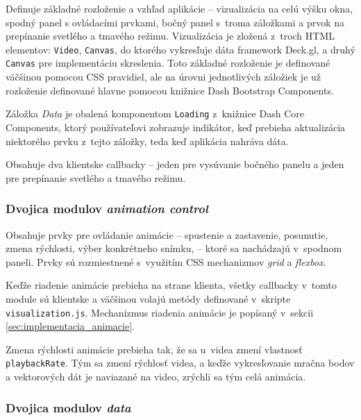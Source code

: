 Definuje základné rozloženie a vzhľad aplikácie -- vizualizácia na celú výšku okna, spodný panel s ovládacími prvkami, bočný panel s~troma záložkami a prvok na prepínanie svetlého a tmavého režimu. Vizualizácia je zložená z~troch HTML elementov: \texttt{Video}, \texttt{Canvas}, do ktorého vykresľuje dáta framework Deck.gl, a druhý \texttt{Canvas} pre implementáciu skreslenia. Toto základné rozloženie je definované väčšinou pomocou CSS pravidiel, ale na úrovni jednotlivých záložiek je už rozloženie definované hlavne pomocou knižnice Dash Bootstrap Components.

Záložka \emph{Data} je obalená komponentom \texttt{Loading} z~knižnice Dash Core Components, ktorý používateľovi zobrazuje indikátor, keď prebieha aktualizácia niektorého prvku z~tejto záložky, teda keď aplikácia nahráva dáta.

Obsahuje dva klientske callbacky -- jeden pre vysúvanie bočného panelu a jeden pre prepínanie svetlého a tmavého režimu.

\subsubsection{Dvojica modulov \emph{animation control} }

Obsahuje prvky pre ovládanie animácie -- spustenie a zastavenie, posunutie, zmena rýchlosti, výber konkrétneho snímku, -- ktoré sa nachádzajú v~spodnom paneli. Prvky sú rozmiestnené s~využitím CSS mechanizmov \emph{grid} a \emph{flexbox}.

Keďže riadenie animácie prebieha na strane klienta, všetky callbacky v~tomto module sú klientske a väčšinou volajú metódy definované v~skripte \texttt{visualization.js}. Mechanizmus riadenia animácie je popísaný v~sekcii \ref{sec:implementacia_animacie}.

Zmena rýchlosti animácie prebieha tak, že sa u~videa zmení vlastnosť \texttt{playbackRate}. Tým sa zmení rýchlosť videa, a keďže vykresľovanie mračna bodov a vektorových dát je naviazané na video, zrýchli sa tým celá animácia.

\subsubsection{Dvojica modulov \emph{data} }

